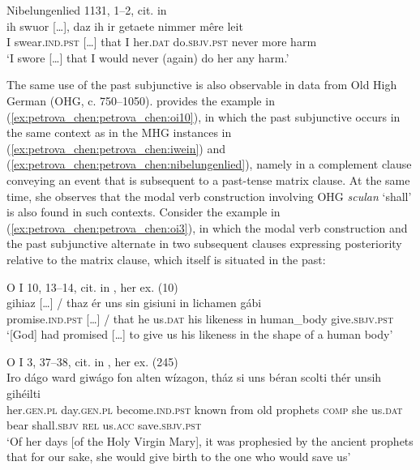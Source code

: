 \documentclass[output=paper,colorlinks,citecolor=brown]{langscibook}
\begin{document}
\ea\label{ex:petrova_chen:petrova_chen:nibelungenlied} Nibelungenlied 1131, 1–2, cit. in \citet[445]{Paul2007}\\ 
    \gll ih swuor […], daz ih ir getaete nimmer mêre leit\\
    I swear.\textsc{ind.pst} […] that I her.\textsc{dat} do.\textsc{sbjv.pst} never more harm\\
    \glt ‘I swore […] that I would never (again) do her any harm.’
\z

The same use of the past subjunctive is also observable in data from Old High German (OHG, c. 750–1050). \citet{Petrova2008} provides the example in (\ref{ex:petrova_chen:petrova_chen:oi10}), in which the past subjunctive occurs in the same context as in the MHG instances in (\ref{ex:petrova_chen:petrova_chen:iwein}) and (\ref{ex:petrova_chen:petrova_chen:nibelungenlied}), namely in a complement clause conveying an event that is subsequent to a past-tense matrix clause. At the same time, she observes that the modal verb construction involving OHG \textit{sculan} ‘shall’ is also found in such contexts. Consider the example in (\ref{ex:petrova_chen:petrova_chen:oi3}), in which the modal verb construction and the past subjunctive alternate in two subsequent clauses expressing posteriority relative to the matrix clause, which itself is situated in the past:


\ea\label{ex:petrova_chen:petrova_chen:oi10} O I 10, 13–14, cit. in \citet[13]{Petrova2008}, her ex. (10)\\ 
    \gll gihiaz […] / thaz ér uns sin gisiuni in lichamen gábi\\
    promise.\textsc{ind.pst} […] / that he us.\textsc{dat} his likeness in human\_body give.\textsc{sbjv.pst}\\
    \glt ‘[God] had promised […] to give us his likeness in the shape of a human body’
\z


\ea\label{ex:petrova_chen:petrova_chen:oi3} O I 3, 37–38, cit. in \citet[175]{Petrova2008}, her ex. (245)\\ 
    \gll Iro dágo ward giwágo fon alten wízagon, tház si uns béran scolti thér unsih gihéilti\\
    her.\textsc{gen.pl} day.\textsc{gen.pl} become.\textsc{ind.pst} known from old prophets \textsc{comp} she us.\textsc{dat} bear shall.\textsc{sbjv} \textsc{rel} us.\textsc{acc} save.\textsc{sbjv.pst}\\
    \glt ‘Of her days [of the Holy Virgin Mary], it was prophesied by the ancient prophets that for our sake, she would give birth to the one who would save us’
\z
\end{document}

